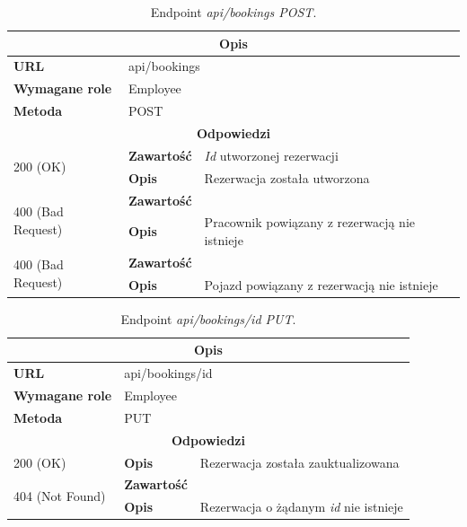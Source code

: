 \documentclass[eng,printmode,openany]{mgr}
\begin{document}
\begin{table}[H]
	\caption{Endpoint \textit{api/bookings POST}.}
	\begin{tabularx}{\textwidth}{|l|l|X|}
		\hline
		\multicolumn{3}{|c|}{\textbf{\textbf{Opis}}}
		\\ \hline
		\textbf{URL}                       & \multicolumn{2}{l|}{api/bookings}
		\\ \hline
		\textbf{Wymagane role}             & \multicolumn{2}{l|}{Employee}
		\\ \hline
		\textbf{Metoda}                    & \multicolumn{2}{l|}{POST}
		\\ \hline
		\multicolumn{3}{|c|}{\textbf{Odpowiedzi}}
		\\ \hline
		\multirow{2}{*}{200 (OK)} 		& \textbf{Zawartość}     & \textit{Id} utworzonej rezerwacji
		\\ \cline{2-3}                  & \textbf{Opis}         	& Rezerwacja została utworzona
		\\ \hline
		\multirow{2}{*}{400 (Bad Request)} 	& \textbf{Zawartość}     &    
		\\ \cline{2-3}                      & \textbf{Opis}          & Pracownik powiązany z rezerwacją nie istnieje      						    
		\\ \hline
		\multirow{2}{*}{400 (Bad Request)} 	& \textbf{Zawartość}     &    
		\\ \cline{2-3}                      & \textbf{Opis}          & Pojazd powiązany z rezerwacją nie istnieje      								
		\\ \hline      
	\end{tabularx}
\end{table}

\begin{table}[H]
	\caption{Endpoint \textit{api/bookings/id PUT}.}
	\begin{tabularx}{\textwidth}{|l|l|X|}
		\hline
		\multicolumn{3}{|c|}{\textbf{\textbf{Opis}}}
		\\ \hline
		\textbf{URL}                       & \multicolumn{2}{l|}{api/bookings/id}
		\\ \hline
		\textbf{Wymagane role}             & \multicolumn{2}{l|}{Employee}
		\\ \hline
		\textbf{Metoda}                    & \multicolumn{2}{l|}{PUT}
		\\ \hline
		\multicolumn{3}{|c|}{\textbf{Odpowiedzi}}
		\\ \hline
		200 (OK) 		                        & \textbf{Opis}      	& Rezerwacja została zauktualizowana
		\\ \hline
		\multirow{2}{*}{404 (Not Found)} 	    & \textbf{Zawartość}     & 
		\\ \cline{2-3}                          & \textbf{Opis}          & Rezerwacja o żądanym \textit{id} nie istnieje
		\\ \hline
	\end{tabularx}
\end{table}
\end{document}
